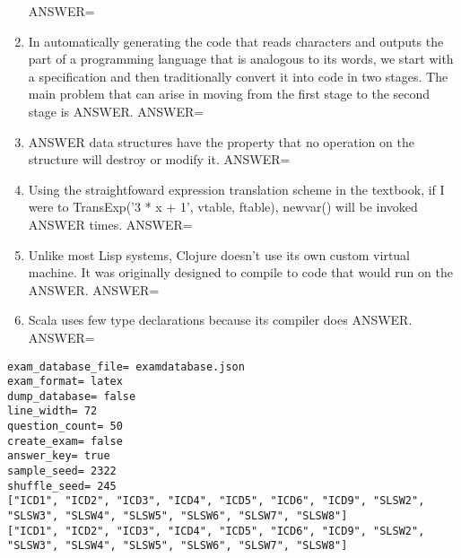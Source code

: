 \documentclass{exam}
\begin{document}
\begin{enumerate}
ANSWER=
\item In automatically generating the code that reads characters and outputs the part of a programming language that is analogous to its words, we start with a specification and then traditionally convert it into code in two stages.  The main problem that can arise in moving from the first stage to the second stage is ANSWER.\newline
ANSWER=
\item ANSWER data structures have the property that no operation on the structure will destroy or modify it.\newline
ANSWER=
\item Using the straightfoward expression translation scheme in the textbook, if I were to TransExp('3 * x + 1', vtable, ftable), newvar() will be invoked ANSWER times.\newline
ANSWER=
\item Unlike most Lisp systems, Clojure doesn't use its own custom virtual machine.  It was originally designed to compile to code that would run on the ANSWER.\newline
ANSWER=
\item Scala uses few type declarations because its compiler does ANSWER.\newline
ANSWER=
\end{enumerate}
\newpage
\begin{verbatim}
exam_database_file= examdatabase.json
exam_format= latex
dump_database= false
line_width= 72
question_count= 50
create_exam= false
answer_key= true
sample_seed= 2322
shuffle_seed= 245
["ICD1", "ICD2", "ICD3", "ICD4", "ICD5", "ICD6", "ICD9", "SLSW2",
"SLSW3", "SLSW4", "SLSW5", "SLSW6", "SLSW7", "SLSW8"]
["ICD1", "ICD2", "ICD3", "ICD4", "ICD5", "ICD6", "ICD9", "SLSW2",
"SLSW3", "SLSW4", "SLSW5", "SLSW6", "SLSW7", "SLSW8"]
\end{verbatim}
\end{document}
